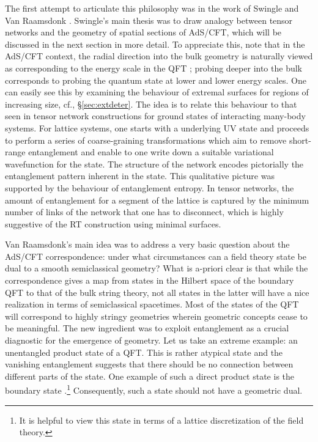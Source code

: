 \documentclass[12pt,openany]{book}
\begin{document}
The first attempt to articulate this philosophy was in the work of Swingle \cite{Swingle:2009bg} and Van Raamsdonk \cite{VanRaamsdonk:2009ar,VanRaamsdonk:2010pw}. Swingle's main thesis was to draw analogy between tensor networks and the geometry of spatial sections of AdS/CFT, which will be discussed in the next section in more detail. To appreciate this, note that in the AdS/CFT context, the radial direction into the bulk geometry is naturally viewed as corresponding to the energy scale in the QFT \cite{Susskind:1998dq}; probing deeper into the bulk corresponds to probing the quantum state at lower and lower energy scales. One can easily see this by examining the behaviour of extremal surfaces for regions of increasing size, cf., \S\ref{sec:extdeter}. The idea is to relate this behaviour to that seen in tensor network constructions for ground states of interacting many-body systems. For lattice systems, one starts with a underlying UV state and proceeds to perform a series of coarse-graining transformations which aim to remove short-range entanglement and enable to one write down a suitable variational wavefunction for the state. The structure of the network encodes pictorially the entanglement pattern inherent in the state. This qualitative picture was supported by the behaviour of entanglement entropy. In tensor networks, the amount of entanglement for a segment of the lattice is captured by the minimum number of links of the network that one has to disconnect, which is highly suggestive of the RT construction using minimal surfaces.

Van Raamsdonk's main idea was to address a very basic question about the AdS/CFT correspondence: under what circumstances can a field theory state be dual to a smooth semiclassical geometry? What is a-priori clear is that while the correspondence gives a map from states in the  Hilbert space of the boundary QFT to that of the bulk string theory, not all states in the latter will have a nice realization in terms of semiclassical spacetimes. Most of the states of the QFT will correspond to highly stringy geometries wherein geometric concepts cease to be meaningful. The new ingredient was to exploit entanglement as a crucial diagnostic for  the emergence of geometry.  Let us take an extreme example: an unentangled product state of a QFT. This is rather atypical state and the vanishing entanglement suggests that there should be no connection between different parts of the state. One example of such a direct product state is the boundary state \cite{Miyaji:2014mca}.\footnote{ It is helpful to view this state in terms of a lattice discretization of the field theory.} Consequently, such a state should not have a geometric dual.
\end{document}
